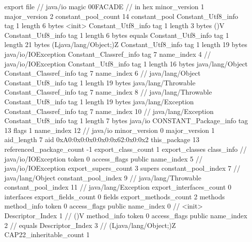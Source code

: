 export file {		// java/io
	magic	00FACADE		 // in hex
	minor_version	1
	major_version	2
	constant_pool_count	14
	constant_pool {
		Constant_Utf8_info {
			tag	1
			length	6
			bytes	<init>
		}
		Constant_Utf8_info {
			tag	1
			length	3
			bytes	()V
		}
		Constant_Utf8_info {
			tag	1
			length	6
			bytes	equals
		}
		Constant_Utf8_info {
			tag	1
			length	21
			bytes	(Ljava/lang/Object;)Z
		}
		Constant_Utf8_info {
			tag	1
			length	19
			bytes	java/io/IOException
		}
		Constant_Classref_info {
			tag	7
			name_index	4		// java/io/IOException
		}
		Constant_Utf8_info {
			tag	1
			length	16
			bytes	java/lang/Object
		}
		Constant_Classref_info {
			tag	7
			name_index	6		// java/lang/Object
		}
		Constant_Utf8_info {
			tag	1
			length	19
			bytes	java/lang/Throwable
		}
		Constant_Classref_info {
			tag	7
			name_index	8		// java/lang/Throwable
		}
		Constant_Utf8_info {
			tag	1
			length	19
			bytes	java/lang/Exception
		}
		Constant_Classref_info {
			tag	7
			name_index	10		// java/lang/Exception
		}
		Constant_Utf8_info {
			tag	1
			length	7
			bytes	java/io
		}
		CONSTANT_Package_info {
			tag	13
			flags	1
			name_index	12		// java/io
			minor_version	0
			major_version	1
			aid_length	7
			aid	0xA0:0x0:0x0:0x0:0x62:0x0:0x2
		}
	}
	this_package	13
	referenced_package_count	-1
	export_class_count	1
	export_classes {
		class_info {		// java/io/IOException
			token	0
			access_flags	public
			name_index	5		// java/io/IOException
			export_supers_count	3
			supers {
				constant_pool_index	7		// java/lang/Object
				constant_pool_index	9		// java/lang/Throwable
				constant_pool_index	11		// java/lang/Exception
			}
			export_interfaces_count	0
			interfaces {
			}
			export_fields_count	0
			fields {
			}
			export_methods_count	2
			methods {
				method_info {
					token	0
					access_flags	public
					name_index	0		// <init>
					Descriptor_Index	1		// ()V
				}
				method_info {
					token	0
					access_flags	public
					name_index	2		// equals
					Descriptor_Index	3		// (Ljava/lang/Object;)Z
				}
			}
			CAP22_inheritable_count	1
		}
	}
}

